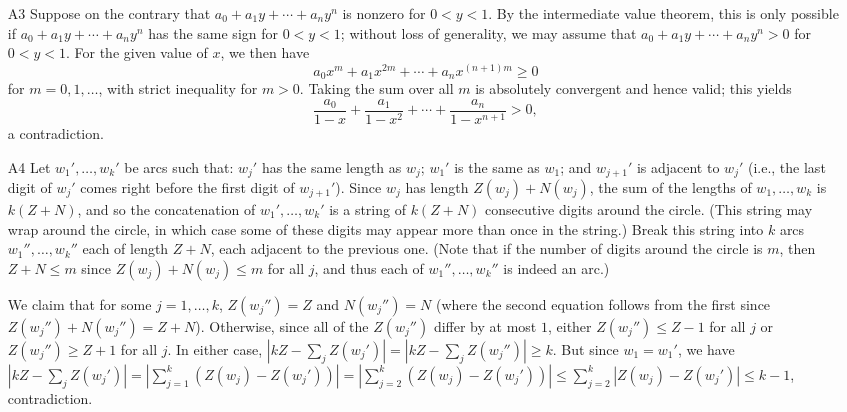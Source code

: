 \documentclass[amssymb,twocolumn,pra,10pt,aps]{revtex4-1}
\begin{document}
\begin{itemize}
\item[A3]
Suppose on the contrary that $a_0 + a_1 y + \cdots + a_n y^n$ is nonzero for $0 < y < 1$. By the intermediate value theorem, this is only possible if $a_0 + a_1 y + \cdots + a_n y^n$ has the same sign for $0 < y < 1$; without loss of generality, we may assume that $a_0 + a_1 y + \cdots + a_n y^n > 0$ for $0 < y < 1$. For the given value of $x$, we then have
\[
a_0 x^m + a_1 x^{2m} + \cdots + a_n x^{(n+1)m} \geq 0
\]
for $m=0,1,\dots$, with strict inequality for $m>0$.
Taking the sum over all $m$ is absolutely convergent and hence valid; this yields
\[
\frac{a_0}{1-x} + \frac{a_1}{1-x^2} + \cdots + \frac{a_n}{1-x^{n+1}} > 0,
\]
a contradiction.

\item[A4]
 Let $w_1',\ldots,w_k'$ be arcs such that: $w_j'$ has the same length as $w_j$; $w_1'$ is the same as $w_1$; and $w_{j+1}'$ is adjacent to $w_j'$ (i.e., the last digit of $w_j'$ comes right before the first digit of $w_{j+1}'$). Since $w_j$ has length $Z(w_j)+N(w_j)$, the sum of the lengths of $w_1,\ldots,w_k$ is $k(Z+N)$, and so the concatenation of $w_1',\ldots,w_k'$ is a string of $k(Z+N)$ consecutive digits around the circle. (This string may wrap around the circle, in which case some of these digits may appear more than once in the string.) Break this string into $k$ arcs $w_1'',\ldots,w_k''$ each of length $Z+N$, each adjacent to the previous one. (Note that if the number of digits around the circle is $m$, then $Z+N \leq m$ since $Z(w_j)+N(w_j) \leq m$ for all $j$, and thus each of $w_1'',\ldots,w_k''$ is indeed an arc.)

We claim that for some $j=1,\ldots,k$, $Z(w_j'')=Z$ and $N(w_j'')=N$ (where the second equation follows from the first since $Z(w_j'')+N(w_j'')=Z+N$). Otherwise, since all of the $Z(w_j'')$ differ by at most $1$, either $Z(w_j'') \leq Z-1$ for all $j$ or $Z(w_j'') \geq Z+1$ for all $j$. In either case,
$|kZ - \sum_j Z(w_j')| = |kZ-\sum_j Z(w_j'')| \geq k$. But since $w_1=w_1'$, we have
$|kZ - \sum_j Z(w_j')| = |\sum_{j=1}^k (Z(w_j)-Z(w_j'))| = |\sum_{j=2}^k (Z(w_j)-Z(w_j'))| \leq \sum_{j=2}^k |Z(w_j)-Z(w_j')| \leq k-1$, contradiction.


\end{itemize}
\end{document}
